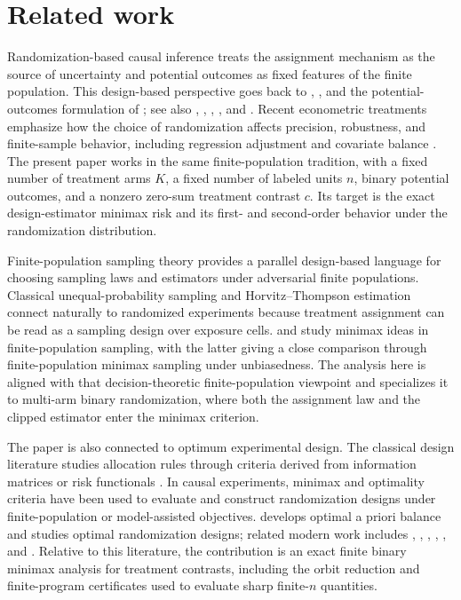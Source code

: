 \section{Related work}\label{sec:related}

Randomization-based causal inference treats the assignment mechanism as the source of uncertainty and potential outcomes as fixed features of the finite population. This design-based perspective goes back to \citet{fisher_1935}, \citet{neyman_1990}, and the potential-outcomes formulation of \citet{rubin_1974,rubin_1978}; see also \citet{holland_1986}, \citet{imbens_rubin_2015}, \citet{imbens_wooldridge_2009}, \citet{athey_imbens_2017}, and \citet{ding_2024}. Recent econometric treatments emphasize how the choice of randomization affects precision, robustness, and finite-sample behavior, including regression adjustment and covariate balance \citep{freedman_2008,lin_2013,dasgupta_2015,morgan_2012,li_2018,bai_2024}. The present paper works in the same finite-population tradition, with a fixed number of treatment arms \(K\), a fixed number of labeled units \(n\), binary potential outcomes, and a nonzero zero-sum treatment contrast \(c\). Its target is the exact design-estimator minimax risk and its first- and second-order behavior under the randomization distribution.

Finite-population sampling theory provides a parallel design-based language for choosing sampling laws and estimators under adversarial finite populations. Classical unequal-probability sampling and Horvitz--Thompson estimation \citep{horvitz_1952,hansen_1953,sarndal_1992} connect naturally to randomized experiments because treatment assignment can be read as a sampling design over exposure cells. \citet{gabler_1990} and \citet{aronow_lopatto_2026_minimax_unbiased} study minimax ideas in finite-population sampling, with the latter giving a close comparison through finite-population minimax sampling under unbiasedness. The analysis here is aligned with that decision-theoretic finite-population viewpoint and specializes it to multi-arm binary randomization, where both the assignment law and the clipped estimator enter the minimax criterion.

The paper is also connected to optimum experimental design. The classical design literature studies allocation rules through criteria derived from information matrices or risk functionals \citep{smith_1918,kiefer_1959,kiefer_1974,atkinson_2007}. In causal experiments, minimax and optimality criteria have been used to evaluate and construct randomization designs under finite-population or model-assisted objectives. \citet{kallus_2018} develops optimal a priori balance and \citet{kallus_2020_optimality} studies optimal randomization designs; related modern work includes \citet{basse_2023}, \citet{harshaw_2024}, \citet{kandiros_2024,kandiros_2026}, \citet{eckles_2014}, \citet{derezinski_2019}, and \citet{hu_2024}. Relative to this literature, the contribution is an exact finite binary minimax analysis for treatment contrasts, including the orbit reduction and finite-program certificates used to evaluate sharp finite-\(n\) quantities.

